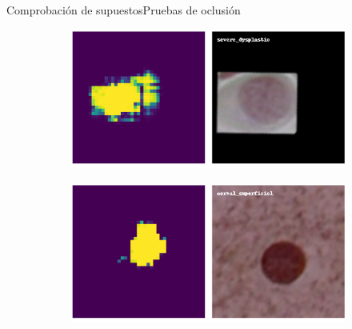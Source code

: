 \documentclass{beamer}
\begin{document}
\begin{frame}{Comprobación de supuestos}{Pruebas de oclusión}
\begin{figure}
    
            \begin{subfigure}{0.48\textwidth}
            \includegraphics[width=\textwidth]{occlusion-severe_dysplastic64.pdf}
            \end{subfigure}\hspace*{\fill}
            \begin{subfigure}{0.48\textwidth}
            \includegraphics[width=\textwidth]{occlusion-normal_superficiel59.pdf}
            \end{subfigure}
    
            \end{figure}
    \end{frame}

\end{document}
